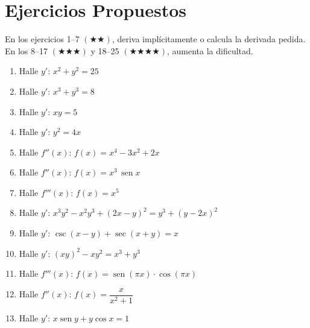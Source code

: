 \documentclass[12pt, letterpaper]{article}
\begin{document}
\newpage
\section{Ejercicios Propuestos}

\noindent En los ejercicios 1--7 $(\bigstar\bigstar)$, deriva implícitamente o calcula la derivada pedida. En los 8--17 $(\bigstar\bigstar\bigstar)$ y 18--25 $(\bigstar\bigstar\bigstar\bigstar)$, aumenta la dificultad.

\begin{enumerate}[leftmargin=*]

  \item \medio{} Halle $y'$: $x^2 + y^2 = 25$

  \item \medio{} Halle $y'$: $x^3 + y^3 = 8$

  \item \medio{} Halle $y'$: $xy = 5$

  \item \medio{} Halle $y'$: $y^2 = 4x$

  \item \medio{} Halle $f''(x)$: $f(x) = x^4 - 3x^2 + 2x$

  \item \medio{} Halle $f''(x)$: $f(x) = x^3\,\operatorname{sen} x$

  \item \medio{} Halle $f'''(x)$: $f(x) = x^5$

  \item \dificil{} Halle $y'$: $x^3 y^2 - x^2 y^3 + (2x-y)^2 = y^3 + (y-2x)^2$ %

  \item \dificil{} Halle $y'$: $\csc(x-y) + \sec(x+y) = x$ %

  \item \dificil{} Halle $y'$: $(xy)^2 - xy^2 = x^3 + y^3$ %

  \item \dificil{} Halle $f'''(x)$: $f(x) = \operatorname{sen}(\pi x)\cdot\cos(\pi x)$ %

  \item \dificil{} Halle $f''(x)$: $f(x) = \dfrac{x}{x^2 + 1}$

  \item \dificil{} Halle $y'$: $x\operatorname{sen} y + y\cos x = 1$


\end{enumerate}
\end{document}
